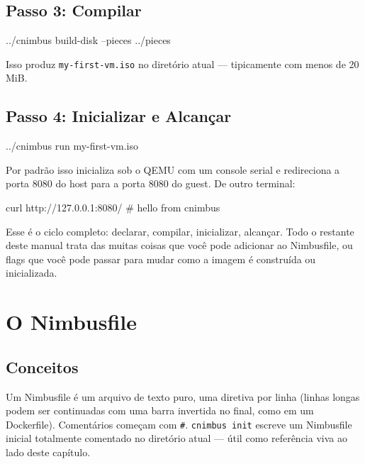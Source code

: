 \documentclass[11pt,letterpaper]{report}
\begin{document}
\section{Passo 3: Compilar}

\begin{shell}
../cnimbus build-disk --pieces ../pieces
\end{shell}

Isso produz \texttt{my-first-vm.iso} no diretório atual --- tipicamente
com menos de 20 MiB.

\section{Passo 4: Inicializar e Alcançar}

\begin{shell}
../cnimbus run my-first-vm.iso
\end{shell}

Por padrão isso inicializa sob o QEMU com um console serial e
redireciona a porta 8080 do host para a porta 8080 do guest. De outro
terminal:

\begin{shell}
curl http://127.0.0.1:8080/
# hello from cnimbus
\end{shell}

Esse é o ciclo completo: declarar, compilar, inicializar, alcançar.
Todo o restante deste manual trata das muitas coisas que você pode
adicionar ao Nimbusfile, ou flags que você pode passar para mudar como
a imagem é construída ou inicializada.

\chapter{O Nimbusfile}
\label{ch:nimbusfile}

\section{Conceitos}

Um Nimbusfile é um arquivo de texto puro, uma diretiva por linha
(linhas longas podem ser continuadas com uma barra invertida no final,
como em um Dockerfile). Comentários começam com \texttt{\#}.
\texttt{cnimbus init} escreve um Nimbusfile inicial totalmente
comentado no diretório atual --- útil como referência viva ao lado
deste capítulo.
\end{document}
